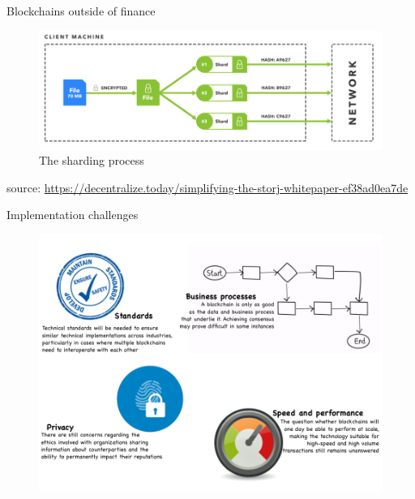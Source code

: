 \documentclass[10pt]{beamer}
\begin{document}

\begin{frame}{Blockchains outside of finance}
	\begin{figure}[]
		\centering
		\includegraphics  [scale=0.3]{Images/storj}
		\caption{The sharding process}
	\end{figure}
		\begin{scriptsize}
		source: \href{https://decentralize.today/simplifying-the-storj-whitepaper-ef38ad0ea7de}{https://decentralize.today/simplifying-the-storj-whitepaper-ef38ad0ea7de}
	\end{scriptsize}
\end{frame}


\begin{frame}{Implementation challenges}
	\begin{figure}[]
		\centering
		\includegraphics  [scale=0.3]{Images/implementation}
	\end{figure}
\end{frame}
\end{document}
